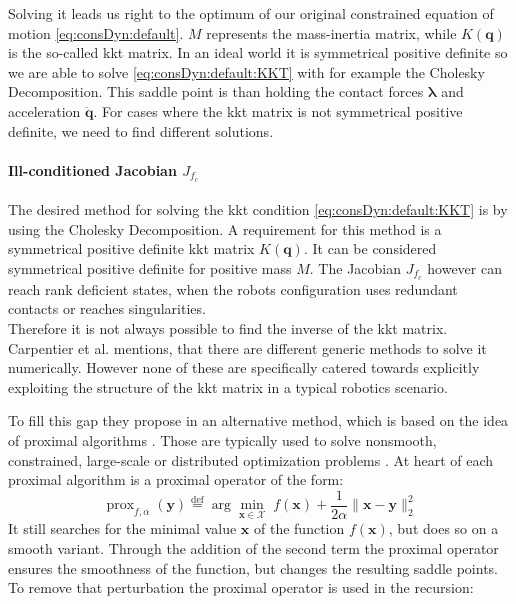 Solving it leads us right to the optimum of our original constrained equation of motion \cref{eq:consDyn:default}.
$M$ represents the mass-inertia matrix, while $K(\bm q)$ is the so-called \acrshort{kkt} matrix.
In an ideal world it is symmetrical positive definite so we are able to solve \cref{eq:consDyn:default:KKT} with for example the Cholesky Decomposition.
This saddle point is than holding the contact forces $\bm \lambda$ and acceleration $\bm{\ddot q}$.
For cases where the \acrshort{kkt} matrix is not symmetrical positive definite, we need to find different solutions.

\paragraph{Ill-conditioned Jacobian $J_{f_c}$}
The desired method for solving the \acrshort{kkt} condition \cref{eq:consDyn:default:KKT} is by using the Cholesky Decomposition.
A requirement for this method is a symmetrical positive definite \acrshort{kkt} matrix $K(\bm q)$.
It can be considered symmetrical positive definite for positive mass $M$.
The Jacobian $J_{f_c}$ however can reach rank deficient states, when the robots configuration uses redundant contacts or reaches singularities.
\\
Therefore it is not always possible to find the inverse of the \acrshort{kkt} matrix.
Carpentier et al. mentions, that there are different generic methods to solve it numerically.
However none of these are specifically catered towards explicitly exploiting the structure of the \acrshort{kkt} matrix in a typical robotics scenario.
\par
To fill this gap they propose in \cite{carpentier_2021} an alternative method, which is based on the idea of proximal algorithms \cite{parikh_2014}.
Those are typically used to solve nonsmooth, constrained, large-scale or distributed optimization problems \cite{parikh_2014}.
At heart of each proximal algorithm is a proximal operator of the form:
\begin{equation}
  \operatorname{prox}_{f,\alpha}(\bm y) \overset{\text{def}}{=} \arg\min_{\bm x \in \mathcal{X}} \; f(\bm x) + \frac{1}{2\alpha} \| \bm x - \bm y\|_2^2
  \label{eq:consDyn:prox:operator}
\end{equation}
It still searches for the minimal value $\bm x$ of the function $f(\bm x)$, but does so on a smooth variant.
Through the addition of the second term the proximal operator ensures the smoothness of the function, but changes the resulting saddle points.
To remove that perturbation the proximal operator is used in the recursion:

